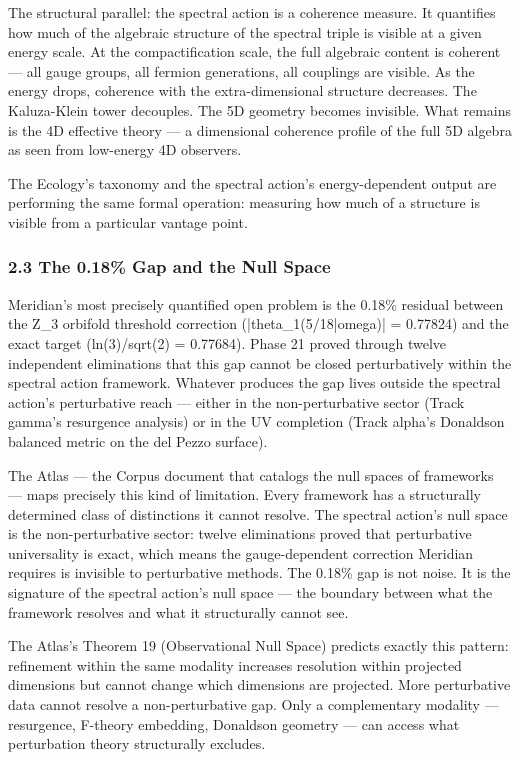 The structural parallel: the spectral action is a coherence measure. It quantifies how much of the algebraic structure of the spectral triple is visible at a given energy scale. At the compactification scale, the full algebraic content is coherent — all gauge groups, all fermion generations, all couplings are visible. As the energy drops, coherence with the extra-dimensional structure decreases. The Kaluza-Klein tower decouples. The 5D geometry becomes invisible. What remains is the 4D effective theory — a dimensional coherence profile of the full 5D algebra as seen from low-energy 4D observers.


The Ecology's taxonomy and the spectral action's energy-dependent output are performing the same formal operation: measuring how much of a structure is visible from a particular vantage point.


\subsubsection*{2.3 The 0.18\% Gap and the Null Space}


Meridian's most precisely quantified open problem is the 0.18\% residual between the Z\_3 orbifold threshold correction (|theta\_1(5/18|omega)| = 0.77824) and the exact target (ln(3)/sqrt(2) = 0.77684). Phase 21 proved through twelve independent eliminations that this gap cannot be closed perturbatively within the spectral action framework. Whatever produces the gap lives outside the spectral action's perturbative reach — either in the non-perturbative sector (Track gamma's resurgence analysis) or in the UV completion (Track alpha's Donaldson balanced metric on the del Pezzo surface).


The Atlas — the Corpus document that catalogs the null spaces of frameworks — maps precisely this kind of limitation. Every framework has a structurally determined class of distinctions it cannot resolve. The spectral action's null space is the non-perturbative sector: twelve eliminations proved that perturbative universality is exact, which means the gauge-dependent correction Meridian requires is invisible to perturbative methods. The 0.18\% gap is not noise. It is the signature of the spectral action's null space — the boundary between what the framework resolves and what it structurally cannot see.


The Atlas's Theorem 19 (Observational Null Space) predicts exactly this pattern: refinement within the same modality increases resolution within projected dimensions but cannot change which dimensions are projected. More perturbative data cannot resolve a non-perturbative gap. Only a complementary modality — resurgence, F-theory embedding, Donaldson geometry — can access what perturbation theory structurally excludes.


